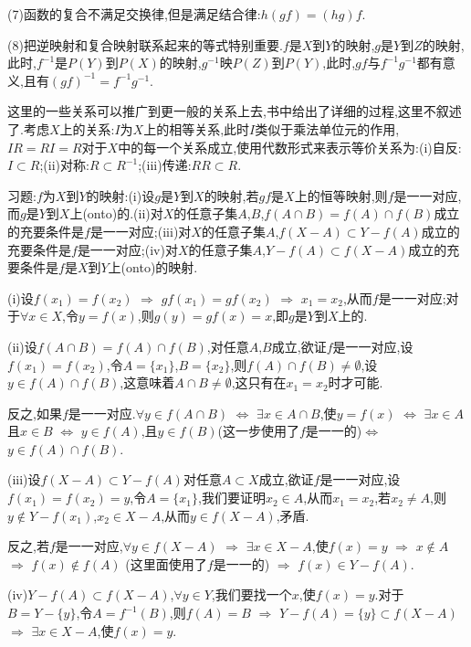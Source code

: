 \documentclass[12pt,a4paper,openany]{book}
\begin{document}
(7)函数的复合不满足交换律,但是满足结合律:$h(gf)=(hg)f$.

(8)把逆映射和复合映射联系起来的等式特别重要.$f$是$X$到$Y$的映射,$g$是$Y$到$Z$的映射,此时,$f^{-1}$是$P(Y)$到$P(X)$的映射,$g^{-1}$映$P(Z)$到$P(Y)$,此时,$gf$与$f^{-1}g^{-1}$都有意义,且有$(gf)^{-1}=f^{-1}g^{-1}$.

这里的一些关系可以推广到更一般的关系上去,书中给出了详细的过程,这里不叙述了.考虑$X$上的关系:$I$为$X$上的相等关系,此时$I$类似于乘法单位元的作用,$IR=RI=R$对于$X$中的每一个关系成立,使用代数形式来表示等价关系为:(i)自反:$I \subset R$;(ii)对称:$R \subset R^{-1}$;(iii)传递:$RR \subset R$.

习题:$f$为$X$到$Y$的映射:(i)设$g$是$Y$到$X$的映射,若$gf$是$X$上的恒等映射,则$f$是一一对应,而$g$是$Y$到$X$上(onto)的.(ii)对$X$的任意子集$A$,$B$,$f(A \cap B)=f(A) \cap f(B)$成立的充要条件是$f$是一一对应;(iii)对$X$的任意子集$A$,$f(X-A) \subset Y-f(A)$成立的充要条件是$f$是一一对应;(iv)对$X$的任意子集$A$,$Y-f(A) \subset f(X-A)$成立的充要条件是$f$是$X$到$Y$上(onto)的映射.

(i)设$f(x_1)=f(x_2)$ $\Rightarrow$ $gf(x_1)=gf(x_2)$ $\Rightarrow$ $x_1=x_2$,从而$f$是一一对应;对于$\forall x \in X$,令$y=f(x)$,则$g(y)=gf(x)=x$,即$g$是$Y$到$X$上的.

(ii)设$f(A \cap B) = f(A) \cap f(B)$,对任意$A$,$B$成立,欲证$f$是一一对应,设$f(x_1)=f(x_2)$,令$A=\{x_1\}$,$B=\{x_2\}$,则$f(A) \cap f(B) \neq \emptyset$,设$y \in f(A) \cap f(B)$,这意味着$A \cap B \neq \emptyset$,这只有在$x_1=x_2$时才可能.

反之,如果$f$是一一对应.$\forall y \in f(A \cap B)$ $\Leftrightarrow$ $\exists x \in A \cap B$,使$y=f(x)$ $\Leftrightarrow$ $\exists x \in A$且$x \in B$ $\Leftrightarrow$ $y \in f(A)$,且$y \in f(B)$(这一步使用了$f$是一一的)$\Leftrightarrow$ $y \in f(A) \cap f(B)$.

(iii)设$f(X-A) \subset Y-f(A)$对任意$A \subset X$成立,欲证$f$是一一对应,设$f(x_1)=f(x_2)=y$,令$A=\{x_1\}$,我们要证明$x_2 \in A$,从而$x_1=x_2$,若$x_2 \neq A$,则$y \notin Y - f(x_1)$,$x_2 \in X-A$,从而$y \in f(X-A)$,矛盾.

反之,若$f$是一一对应,$\forall y \in f(X-A)$ $\Rightarrow$ $\exists x \in X-A$,使$f(x)=y$ $\Rightarrow$ $x \notin A$ $\Rightarrow$ $f(x) \notin f(A)$ (这里面使用了$f$是一一的) $\Rightarrow$ $f(x) \in Y-f(A)$.

(iv)$Y-f(A) \subset f(X-A)$,$\forall y \in Y$,我们要找一个$x$,使$f(x)=y$.对于$B=Y-\{y\}$,令$A=f^{-1}(B)$,则$f(A)=B$ $\Rightarrow$ $Y-f(A)=\{y\} \subset f(X-A)$ $\Rightarrow$ $\exists x \in X-A$,使$f(x)=y$.
\end{document}
